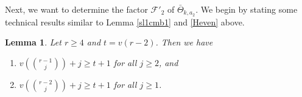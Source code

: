 \documentclass[11pt, reqno]{amsart}
\numberwithin{equation}{section}
\newcommand\sF{{\mathcal{F}}}
\newtheorem{lemma}[thm]{Lemma}
\theoremstyle{definition}
\theoremstyle{remark}
\newtheorem{remark}[thm]{Remark}
\theoremstyle{definition}
\theoremstyle{remark}
\theoremstyle{remark}
\begin{document}

Next, we want to determine the factor $\sF'_2$ of $\bar\Theta_{k,a_2}$. We begin by stating some technical results similar to Lemma \ref{sl1cmb1} and \ref{Heven} above. %
\begin{lemma}\label{sl1cmb2}
Let $r\geq 4$ and $t=v(r-2)$. Then  we have  
\begin{enumerate}
    \item 
$v\left({r-1 \choose j}\right)+j \geq t+1$ for all $j\geq2$, and \label{sl1cmb2a}
\item $v\left({r-2 \choose j}\right)+j \geq t+1$ for all $j\geq1$.\label{sl1cmb2b}
\end{enumerate}
\end{lemma}
\end{document}
